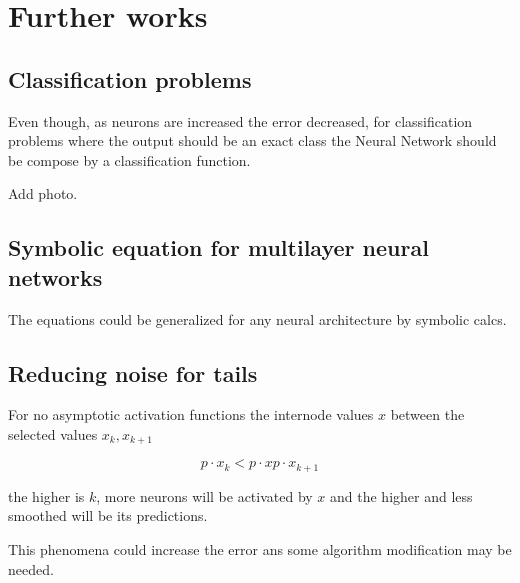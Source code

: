 \section*{Further works}

\subsection*{Classification problems} 
Even though, as neurons are increased the error decreased,
for classification problems where the output should be an exact class the Neural Network should be compose by a classification function. 

Add photo. 


\subsection*{Symbolic equation for multilayer neural networks}

The equations could be generalized for any neural architecture by symbolic calcs. 

\subsection*{Reducing noise for tails}

For no asymptotic activation functions the internode values $x$ between the 
selected values $x_k, x_{k+1}$

\begin{equation}
    p \cdot x_k  
    < p \cdot x
    p \cdot x_{k+1} 
\end{equation}

the higher is $k$, more neurons will be activated  by $x$ and the higher and less smoothed will be its predictions. 

This phenomena could increase the error ans some algorithm modification may be needed. 

